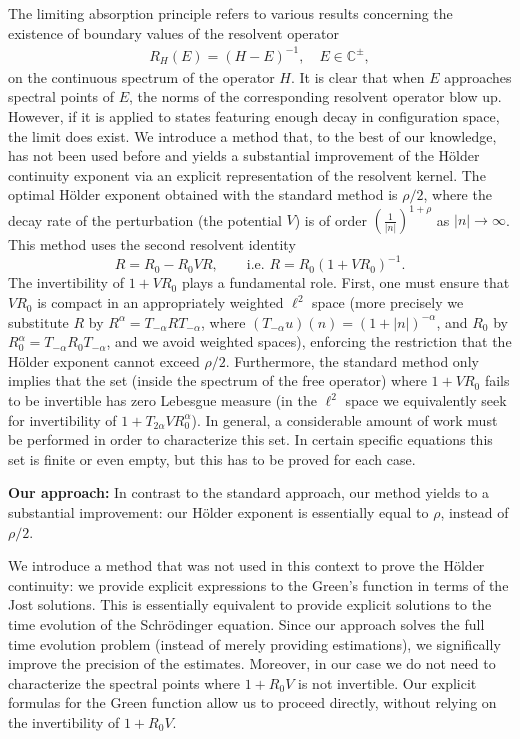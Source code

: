 \documentclass[12pt,oneside,onecolumn,open]{article}
\begin{document}
The limiting absorption principle refers to various results concerning the existence of boundary values of the resolvent operator
\begin{align}\label{RES}
R_{H}(E)=(H-E)^{-1}, \quad E \in \mathbb{C}^{\pm},
\end{align}
on the continuous spectrum of the operator \( H \). It is clear that when $E$ approaches spectral points of $E$, the norms of the corresponding resolvent operator blow up. However, if it is applied to states featuring enough decay in configuration space, the limit does exist. We introduce a method that, to the best of our knowledge, has not been used before and yields a substantial improvement of the H\"older continuity exponent via an explicit representation of the resolvent kernel. The optimal H\"older exponent obtained with the standard method is $\rho/2$, where the decay rate of the perturbation (the potential $V$) is of order $\left(\frac{1}{|n|}\right)^{1+\rho}$ as $|n| \to \infty$. This method uses the second resolvent identity
\[
R = R_0 - R_0 V R, \qquad \text{i.e. } R = R_0(1 + V R_0)^{-1}.
\]
The invertibility of $1 + V R_0$ plays a fundamental role. First, one must ensure that $V R_0$ is compact in an appropriately weighted $\ell^2$ space (more precisely we substitute $R$ by $R^\alpha=T_{-\alpha} R T_{-\alpha}$, where $(T_{-\alpha}u)(n)=(1+|n|)^{-\alpha}$, and $R_0$ by $R_0^\alpha = T_{-\alpha}R_0T_{-\alpha}$, and we avoid weighted spaces), enforcing the restriction that the H\"older exponent cannot exceed $\rho/2$. Furthermore, the standard method only implies that the set (inside the spectrum of the free operator) where $1 + V R_0$ fails to be invertible has zero Lebesgue measure (in the $\ell^2$ space we equivalently seek for invertibility of $1+T_{2\alpha}VR_0^\alpha$). In general, a considerable amount of work must be performed in order to characterize this set. In certain specific equations this set is finite or even empty, but this has to be proved for each case.

\textbf{Our approach:}  
In contrast to the standard approach, our method yields to a substantial improvement: our H\"older exponent is essentially equal to $\rho$, instead of $\rho/2$.

We introduce a method that was not used in this context to prove the H\"older continuity: we provide explicit expressions to the Green's function in terms of the Jost solutions. This is essentially equivalent to provide explicit solutions to the time evolution of the Schr\"odinger equation. Since our approach solves the full time evolution problem (instead of merely providing estimations), we significally improve the precision of the estimates.
Moreover, in our case we do not need to characterize the spectral points where $1 + R_0 V$ is not invertible. Our explicit formulas for the Green function allow us to proceed directly, without relying on the invertibility of $1+R_0V$.
\end{document}
